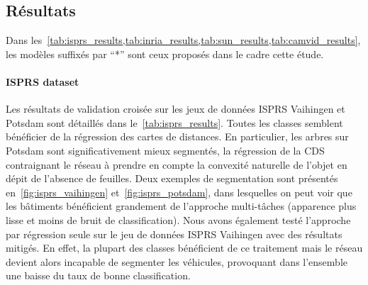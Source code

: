 \subsection{Résultats}

Dans les~\cref{tab:isprs_results,tab:inria_results,tab:sun_results,tab:camvid_results}, les modèles suffixés par ``*'' sont ceux proposés dans le cadre cette étude.

\paragraph{ISPRS dataset}
Les résultats de validation croisée sur les jeux de données ISPRS Vaihingen et Potsdam sont détaillés dans le~\cref{tab:isprs_results}. Toutes les classes semblent bénéficier de la régression des cartes de distances. En particulier, les arbres sur Potsdam sont significativement mieux segmentés, la régression de la CDS contraignant le réseau à prendre en compte la convexité naturelle de l'objet en dépit de l'absence de feuilles. Deux exemples de segmentation sont présentés en~\cref{fig:isprs_vaihingen} et~\cref{fig:isprs_potsdam}, dans lesquelles on peut voir que les bâtiments bénéficient grandement de l'approche multi-tâches (apparence plus lisse et moins de bruit de classification). Nous avons également testé l'approche par régression seule sur le jeu de données ISPRS Vaihingen avec des résultats mitigés. En effet, la plupart des classes bénéficient de ce traitement mais le réseau devient alors incapable de segmenter les véhicules, provoquant dans l'ensemble une baisse du taux de bonne classification.

